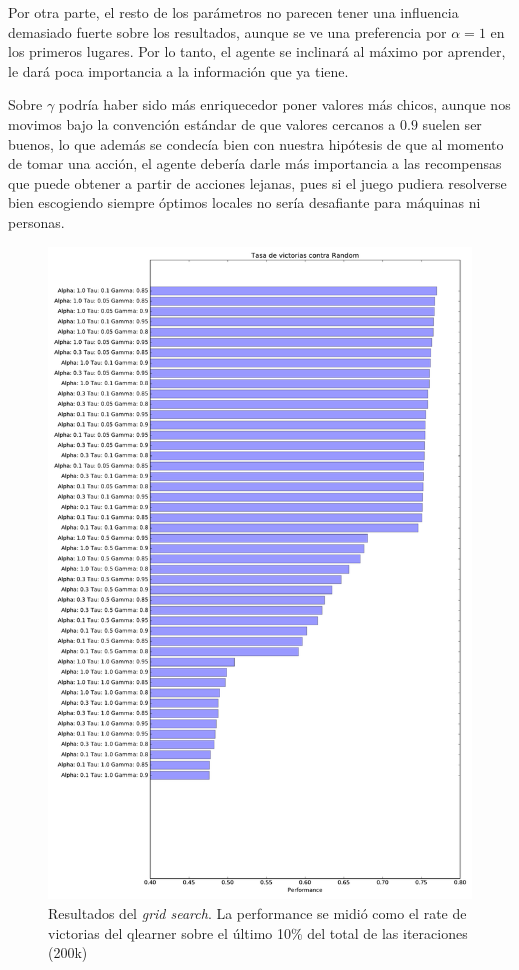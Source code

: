 \documentclass[10pt,a4paper]{article}
\begin{document}
\begin{itemize}
    Por otra parte, el resto de los parámetros no parecen tener una influencia demasiado fuerte sobre los resultados, aunque se ve una preferencia por $\alpha = 1$ en los primeros lugares. Por lo tanto, el agente se inclinará al máximo por aprender, le dará poca importancia a la información que ya tiene. 
    
    Sobre $\gamma$ podría haber sido más enriquecedor poner valores más chicos, aunque nos movimos bajo la convención estándar de que valores cercanos a $0.9$ suelen ser buenos, lo que además se condecía bien con nuestra hipótesis de que al momento de tomar una acción, el agente debería darle más importancia a las recompensas que puede obtener a partir de acciones lejanas, pues si el juego pudiera resolverse bien escogiendo siempre óptimos locales no sería desafiante para máquinas ni personas. 
		
	\begin{figure}
    	\centering
		\includegraphics[scale=0.48]{graficos/grid_search.pdf}
		\caption{Resultados del \emph{grid search}. La performance se midió como el rate de victorias del qlearner sobre el último 10\% del total de las iteraciones (200k)}
		\label{fig:grid}	
	\end{figure}


\end{itemize}
\end{document}
